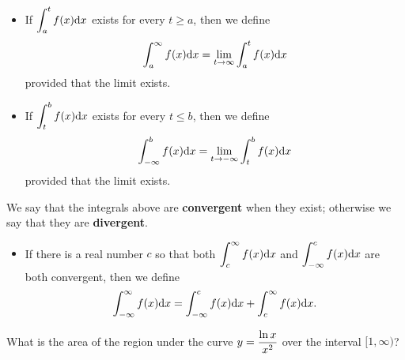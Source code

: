 \begin{definition}\,
\begin{itemize}
\item If $\displaystyle\int_a^tf(x)\mathrm{d} x$ exists for every $t\ge a$, then we define
\begin{equation*}
\int_a^\infty f(x)\mathrm{d} x = \lim_{t\to\infty}\int_a^t f(x)\mathrm{d} x
\end{equation*}
provided that the limit exists.
\item If $\displaystyle\int_t^bf(x)\mathrm{d} x$ exists for every $t\le b$, then we define
\begin{equation*}
\int_{-\infty}^b f(x)\mathrm{d} x = \lim_{t\to-\infty}\int_t^b f(x)\mathrm{d} x
\end{equation*}
provided that the limit exists.
\end{itemize}
We say that the integrals above are \textbf{convergent} when they exist; otherwise we say that they are \textbf{divergent}.
\begin{itemize}
\item If there is a real number $c$ so that both $\displaystyle\int_c^\infty f(x)\mathrm{d} x$ and $\displaystyle\int_{-\infty}^cf(x)\mathrm{d} x$ are both convergent, then we define
\begin{equation*}
\int_{-\infty}^\infty f(x)\mathrm{d} x = \int_{-\infty}^cf(x)\mathrm{d} x + \int_c^\infty f(x)\mathrm{d} x.
\end{equation*}
\end{itemize}
\end{definition}


\begin{example}
What is the area of the region under the curve $y=\displaystyle\frac{\ln x}{x^2}$ over the interval $[1,\infty)$?
\end{example}

\ifdefined\SOLUTION
{}
\fi

